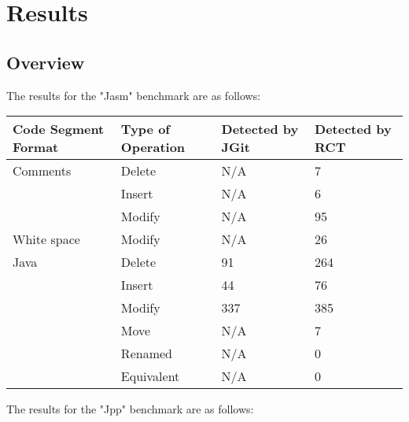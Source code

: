 \section{Results}
\subsection{Overview}
The results for the "Jasm" benchmark are as follows: 

\begin{table}[H]
    \begin{tabular}{llll}
    Code Segment Format & Type of Operation & Detected by JGit & Detected by RCT \\ \hline
    Comments            & Delete            & N/A              & 7               \\
    ~                   & Insert            & N/A              & 6               \\
    ~                   & Modify            & N/A              & 95              \\
    White space         & Modify            & N/A              & 26              \\
    Java                & Delete            & 91               & 264             \\
    ~                   & Insert            & 44               & 76              \\
    ~                   & Modify            & 337              & 385             \\
    ~                   & Move              & N/A              & 7               \\
    ~                   & Renamed           & N/A              & 0               \\
    ~                   & Equivalent        & N/A              & 0               \\
    \end{tabular}
\end{table}

The results for the "Jpp" benchmark are as follows: 

